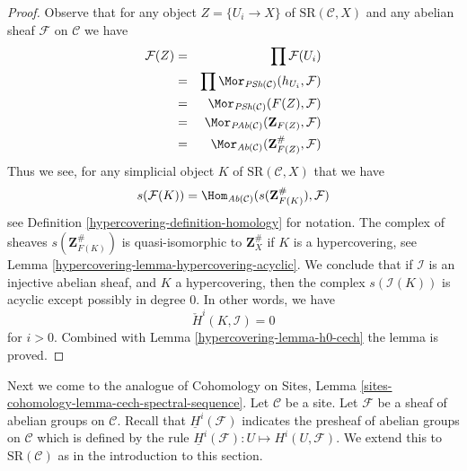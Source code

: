 \begin{proof}

Observe that for any object $Z = \{U_i \to X\}$ of
$\text{SR}(\mathcal{C}, X)$ and any abelian sheaf
$\mathcal{F}$ on $\mathcal{C}$ we have
\begin{eqnarray*}
\mathcal{F}(Z)
& = &
\prod \mathcal{F}(U_i) \\
& = &
\prod \Mor_{\textit{PSh}(\mathcal{C})}(h_{U_i}, \mathcal{F})\\
& = &
\Mor_{\textit{PSh}(\mathcal{C})}(F(Z), \mathcal{F})\\
& = &
\Mor_{\textit{PAb}(\mathcal{C})}(\mathbf{Z}_{F(Z)}, \mathcal{F}) \\
& = &
\Mor_{\textit{Ab}(\mathcal{C})}(\mathbf{Z}_{F(Z)}^\#, \mathcal{F})
\end{eqnarray*}
Thus we see, for any simplicial object $K$ of
$\text{SR}(\mathcal{C}, X)$ that we have
\begin{equation}
\label{equation-identify-cech}
s(\mathcal{F}(K))
=
\Hom_{\textit{Ab}(\mathcal{C})}(s(\mathbf{Z}_{F(K)}^\#), \mathcal{F})
\end{equation}
see Definition \ref{hypercovering-definition-homology} for notation.
The complex of sheaves $s(\mathbf{Z}_{F(K)}^\#)$ is quasi-isomorphic
to $\mathbf{Z}_X^\#$ if $K$ is a hypercovering, see
Lemma \ref{hypercovering-lemma-hypercovering-acyclic}. We conclude
that if $\mathcal{I}$ is an injective abelian sheaf, and
$K$ a hypercovering, then the complex $s(\mathcal{I}(K))$
is acyclic except possibly in degree $0$.
In other words, we have
$$
\check{H}^i(K, \mathcal{I}) = 0
$$
for $i > 0$. Combined with Lemma \ref{hypercovering-lemma-h0-cech} the lemma is proved.
\end{proof}

Next we come to the analogue of Cohomology on Sites, Lemma
\ref{sites-cohomology-lemma-cech-spectral-sequence}.
Let $\mathcal{C}$ be a site.
Let $\mathcal{F}$ be a sheaf of abelian groups on $\mathcal{C}$.
Recall that $\underline{H}^i(\mathcal{F})$ indicates the presheaf
of abelian groups on $\mathcal{C}$ which is defined by the
rule $\underline{H}^i(\mathcal{F}) : U \longmapsto H^i(U, \mathcal{F})$.
We extend this to $\text{SR}(\mathcal{C})$ as in the introduction
to this section.

